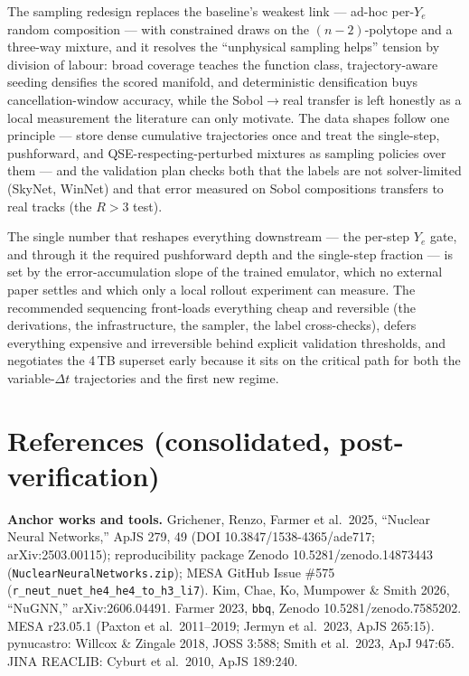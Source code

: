 \documentclass[11pt]{article}
\newcommand{\bbq}{\texttt{bbq}}
\begin{document}
The sampling redesign replaces the baseline's weakest link --- ad-hoc per-$Y_e$ random composition --- with constrained draws on the $(n-2)$-polytope and a three-way mixture, and it resolves the ``unphysical sampling helps'' tension by division of labour: broad coverage teaches the function class, trajectory-aware seeding densifies the scored manifold, and deterministic densification buys cancellation-window accuracy, while the Sobol$\to$real transfer is left honestly as a local measurement the literature can only motivate. The data shapes follow one principle --- store dense cumulative trajectories once and treat the single-step, pushforward, and QSE-respecting-perturbed mixtures as sampling policies over them --- and the validation plan checks both that the labels are not solver-limited (SkyNet, WinNet) and that error measured on Sobol compositions transfers to real tracks (the $R > 3$ test).

The single number that reshapes everything downstream --- the per-step $Y_e$ gate, and through it the required pushforward depth and the single-step fraction --- is set by the error-accumulation slope of the trained emulator, which no external paper settles and which only a local rollout experiment can measure. The recommended sequencing front-loads everything cheap and reversible (the derivations, the infrastructure, the sampler, the label cross-checks), defers everything expensive and irreversible behind explicit validation thresholds, and negotiates the 4\,TB superset early because it sits on the critical path for both the variable-$\Delta t$ trajectories and the first new regime.

\section*{References (consolidated, post-verification)}

\textbf{Anchor works and tools.} Grichener, Renzo, Farmer et al.\ 2025, ``Nuclear Neural Networks,'' ApJS 279, 49 (DOI 10.3847/1538-4365/ade717; arXiv:2503.00115); reproducibility package Zenodo 10.5281/zenodo.14873443 (\texttt{NuclearNeuralNetworks.zip}); MESA GitHub Issue \#575 (\texttt{r\_neut\_nuet\_he4\_he4\_to\_h3\_li7}). Kim, Chae, Ko, Mumpower \& Smith 2026, ``NuGNN,'' arXiv:2606.04491. Farmer 2023, \bbq{}, Zenodo 10.5281/zenodo.7585202. MESA r23.05.1 (Paxton et al.\ 2011--2019; Jermyn et al.\ 2023, ApJS 265:15). pynucastro: Willcox \& Zingale 2018, JOSS 3:588; Smith et al.\ 2023, ApJ 947:65. JINA REACLIB: Cyburt et al.\ 2010, ApJS 189:240.
\end{document}
